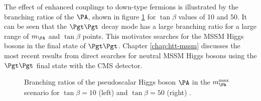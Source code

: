 The effect of enhanced couplings to down-type fermions is illustrated by the
branching ratios of the $\PA$, shown in figure \ref{fig:mhmaxBRs} for $\tan\beta$
values of 10 and 50. It can be seen that the $\Pgt\Pgt$ decay mode has a large
branching ratio for a large range of $m_{\PA}$ and $\tan\beta$ points. This
motivates searches for the \ac{MSSM} Higgs bosons in the final state of $\Pgt\Pgt$. 
Chapter \ref{chap:htt-mssm} discusses the most recent results 
from direct searches for neutral \ac{MSSM} Higgs bosons using the $\Pgt\Pgt$
final state with the CMS detector.

\begin{figure}[htbp]
\caption{Branching ratios of the pseudoscalar Higgs boson $\PA$ in the
$m_{\Ph}^{\text{max}}$ scenario for $\tan\beta=10$ (left) and $\tan\beta=50$
(right) \cite{Heinemeyer:2013tqa}.}
\label{fig:mhmaxBRs}
\end{figure}

